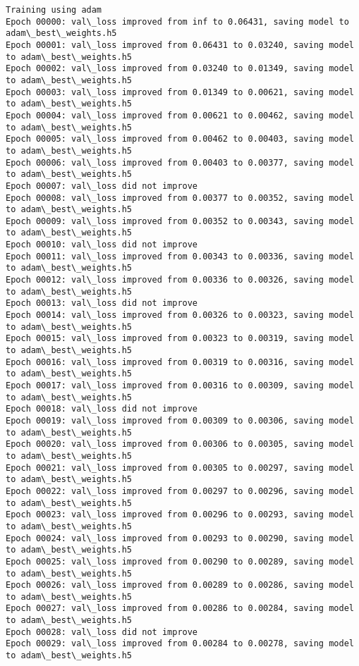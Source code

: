 \documentclass[11pt]{article}
\begin{document}
\begin{Verbatim}[commandchars=\\\{\}]
Training using adam
Epoch 00000: val\_loss improved from inf to 0.06431, saving model to adam\_best\_weights.h5
Epoch 00001: val\_loss improved from 0.06431 to 0.03240, saving model to adam\_best\_weights.h5
Epoch 00002: val\_loss improved from 0.03240 to 0.01349, saving model to adam\_best\_weights.h5
Epoch 00003: val\_loss improved from 0.01349 to 0.00621, saving model to adam\_best\_weights.h5
Epoch 00004: val\_loss improved from 0.00621 to 0.00462, saving model to adam\_best\_weights.h5
Epoch 00005: val\_loss improved from 0.00462 to 0.00403, saving model to adam\_best\_weights.h5
Epoch 00006: val\_loss improved from 0.00403 to 0.00377, saving model to adam\_best\_weights.h5
Epoch 00007: val\_loss did not improve
Epoch 00008: val\_loss improved from 0.00377 to 0.00352, saving model to adam\_best\_weights.h5
Epoch 00009: val\_loss improved from 0.00352 to 0.00343, saving model to adam\_best\_weights.h5
Epoch 00010: val\_loss did not improve
Epoch 00011: val\_loss improved from 0.00343 to 0.00336, saving model to adam\_best\_weights.h5
Epoch 00012: val\_loss improved from 0.00336 to 0.00326, saving model to adam\_best\_weights.h5
Epoch 00013: val\_loss did not improve
Epoch 00014: val\_loss improved from 0.00326 to 0.00323, saving model to adam\_best\_weights.h5
Epoch 00015: val\_loss improved from 0.00323 to 0.00319, saving model to adam\_best\_weights.h5
Epoch 00016: val\_loss improved from 0.00319 to 0.00316, saving model to adam\_best\_weights.h5
Epoch 00017: val\_loss improved from 0.00316 to 0.00309, saving model to adam\_best\_weights.h5
Epoch 00018: val\_loss did not improve
Epoch 00019: val\_loss improved from 0.00309 to 0.00306, saving model to adam\_best\_weights.h5
Epoch 00020: val\_loss improved from 0.00306 to 0.00305, saving model to adam\_best\_weights.h5
Epoch 00021: val\_loss improved from 0.00305 to 0.00297, saving model to adam\_best\_weights.h5
Epoch 00022: val\_loss improved from 0.00297 to 0.00296, saving model to adam\_best\_weights.h5
Epoch 00023: val\_loss improved from 0.00296 to 0.00293, saving model to adam\_best\_weights.h5
Epoch 00024: val\_loss improved from 0.00293 to 0.00290, saving model to adam\_best\_weights.h5
Epoch 00025: val\_loss improved from 0.00290 to 0.00289, saving model to adam\_best\_weights.h5
Epoch 00026: val\_loss improved from 0.00289 to 0.00286, saving model to adam\_best\_weights.h5
Epoch 00027: val\_loss improved from 0.00286 to 0.00284, saving model to adam\_best\_weights.h5
Epoch 00028: val\_loss did not improve
Epoch 00029: val\_loss improved from 0.00284 to 0.00278, saving model to adam\_best\_weights.h5

\end{Verbatim}
\end{document}
